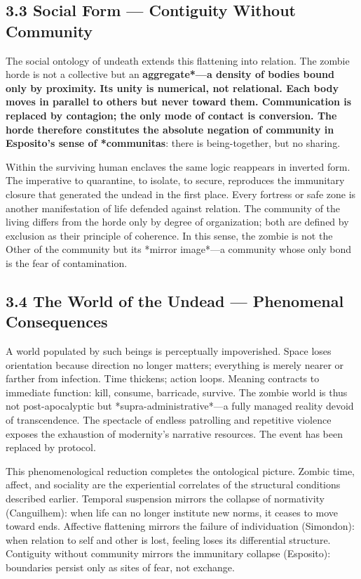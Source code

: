 \documentclass[11pt]{article}
\begin{document}
\subsection*{3.3 Social Form — Contiguity Without Community}
\label{sec:org9f41d57}

The social ontology of undeath extends this flattening into relation. The zombie horde is not a collective but an \textbf{aggregate*—a density of bodies bound only by proximity. Its unity is numerical, not relational. Each body moves in parallel to others but never toward them. Communication is replaced by contagion; the only mode of contact is conversion. The horde therefore constitutes the absolute negation of community in Esposito’s sense of *communitas}: there is being-together, but no sharing.

Within the surviving human enclaves the same logic reappears in inverted form. The imperative to quarantine, to isolate, to secure, reproduces the immunitary closure that generated the undead in the first place. Every fortress or safe zone is another manifestation of life defended against relation. The community of the living differs from the horde only by degree of organization; both are defined by exclusion as their principle of coherence. In this sense, the zombie is not the Other of the community but its *mirror image*—a community whose only bond is the fear of contamination.
\subsection*{3.4 The World of the Undead — Phenomenal Consequences}
\label{sec:org35a973c}

A world populated by such beings is perceptually impoverished. Space loses orientation because direction no longer matters; everything is merely nearer or farther from infection. Time thickens; action loops. Meaning contracts to immediate function: kill, consume, barricade, survive. The zombie world is thus not post-apocalyptic but *supra-administrative*—a fully managed reality devoid of transcendence. The spectacle of endless patrolling and repetitive violence exposes the exhaustion of modernity’s narrative resources. The event has been replaced by protocol.

This phenomenological reduction completes the ontological picture. Zombic time, affect, and sociality are the experiential correlates of the structural conditions described earlier. Temporal suspension mirrors the collapse of normativity (Canguilhem): when life can no longer institute new norms, it ceases to move toward ends. Affective flattening mirrors the failure of individuation (Simondon): when relation to self and other is lost, feeling loses its differential structure. Contiguity without community mirrors the immunitary collapse (Esposito): boundaries persist only as sites of fear, not exchange.
\end{document}
